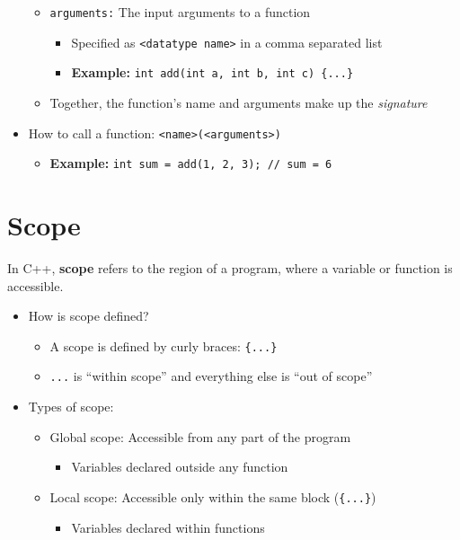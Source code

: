 \documentclass{article}
\begin{document}
\begin{itemize}
\begin{itemize}
		\item \texttt{arguments:} The input arguments to a function
		\begin{itemize}
			\item Specified as \texttt{<datatype name>} in a comma separated list
			\item \textbf{Example:} \texttt{int add(int a, int b, int c) \{...\}}
		\end{itemize}
		\item Together, the function's name and arguments make up the \textit{signature}
	\end{itemize}
	\item How to call a function: \texttt{<name>(<arguments>)}
	\begin{itemize}
	\item \textbf{Example:} \texttt{int sum = add(1, 2, 3); // sum = 6}
	\end{itemize}
	
\end{itemize}

\section{Scope}

\noindent
In C++, \textbf{scope} refers to the region of a program, where a variable or function is accessible.

\begin{itemize}
	\item How is scope defined?
	\begin{itemize}
		\item A scope is defined by curly braces: \texttt{\{...\}}
		\item \texttt{...} is ``within scope'' and everything else is ``out of scope''
	\end{itemize}
	\item Types of scope:
	\begin{itemize}
		\item Global scope: Accessible from any part of the program
		\begin{itemize}
			\item Variables declared outside any function
		\end{itemize}
		\item Local scope: Accessible only within the same block (\texttt{\{...\}})
		\begin{itemize}
			\item Variables declared within functions
		\end{itemize}
	\end{itemize}
\end{itemize}
\end{document}
